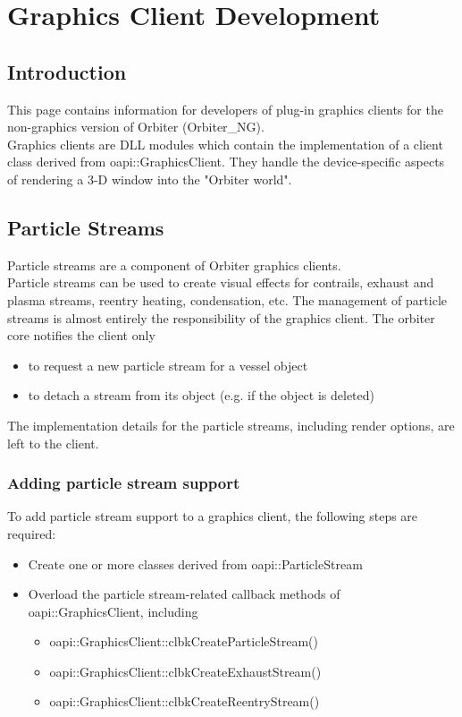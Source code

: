 \documentclass[Orbiter Developer Manual.tex]{subfiles}
\begin{document}
\section{Graphics Client Development}

\subsection{Introduction}
This page contains information for developers of plug-in graphics clients for the non-graphics version of Orbiter (Orbiter\_NG).\\
Graphics clients are DLL modules which contain the implementation of a client class derived from oapi::GraphicsClient. They handle the device-specific aspects of rendering a 3-D window into the "Orbiter world".


\subsection{Particle Streams}
Particle streams are a component of Orbiter graphics clients.\\
Particle streams can be used to create visual effects for contrails, exhaust and plasma streams, reentry heating, condensation, etc. The management of particle streams is almost entirely the responsibility of the graphics client. The orbiter core notifies the client only
\begin{itemize}
\item to request a new particle stream for a vessel object
\item to detach a stream from its object (e.g. if the object is deleted)
\end{itemize}

\noindent
The implementation details for the particle streams, including render options, are left to the client.


\subsubsection{Adding particle stream support}

To add particle stream support to a graphics client, the following steps are required:
\begin{itemize}
\item Create one or more classes derived from oapi::ParticleStream
\item Overload the particle stream-related callback methods of oapi::GraphicsClient, including
\begin{itemize}
\item oapi::GraphicsClient::clbkCreateParticleStream()
\item oapi::GraphicsClient::clbkCreateExhaustStream()
\item oapi::GraphicsClient::clbkCreateReentryStream()
\end{itemize}
\end{itemize}
\end{document}

